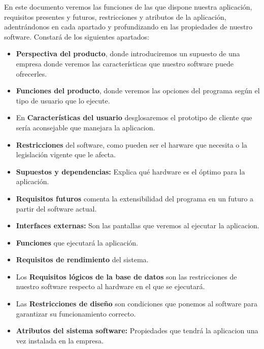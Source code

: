 \documentclass[spanish,a4paper,12pt]{report}	%
\begin{document}
En este documento veremos las funciones de las que dispone nuestra aplicación, requisitos presentes y futuros, restricciones y atributos de la aplicación, adentrándonos en cada apartado y profundizando en las propiedades de nuestro software.
Constará de los siguientes apartados:
	\begin{itemize}
		\item \textbf{Perspectiva del producto}, donde introduciremos un supuesto de una empresa donde veremos las características que nuestro software puede ofrecerles.
		\item \textbf{Funciones del producto}, donde veremos las opciones del programa según el tipo de usuario que lo ejecute.
		\item En \textbf{Características del usuario} desglosaremos el prototipo de cliente que sería aconsejable que manejara la aplicacion.
		\item \textbf{Restricciones} del software, como pueden ser el harware que necesita o la legislación vigente que le afecta.
		\item \textbf{Supuestos y dependencias:} Explica qué hardware es el óptimo para la aplicación.
		\item \textbf{Requisitos futuros} comenta la extensibilidad del programa en un futuro a partir del software actual.
		\item \textbf{Interfaces externas:} Son las pantallas que veremos al ejecutar la aplicacion.
		\item \textbf{Funciones} que ejecutará la aplicación.
		\item \textbf{Requisitos de rendimiento} del sistema.
		\item Los \textbf{Requisitos lógicos de la base de datos} son las restricciones de nuestro software respecto al hardware en el que se ejecutará.
		\item Las \textbf{Restricciones de diseño} son condiciones que ponemos al software para garantizar su funcionamiento correcto.
		\item \textbf{Atributos del sistema software:} Propiedades que tendrá la aplicacion una vez instalada en la empresa.
	\end{itemize}

\newpage
\mbox{}
\thispagestyle{empty}						%
\newpage

\setcounter{section}{0}

\end{document}
